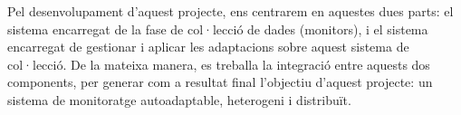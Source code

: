 Pel desenvolupament d'aquest projecte, ens centrarem en aquestes dues parts: el sistema encarregat de la fase de col·lecció de dades (monitors), i el sistema encarregat de gestionar i aplicar les adaptacions sobre aquest sistema de col·lecció. De la mateixa manera, es treballa la integració entre aquests dos components, per generar com a resultat final l'objectiu d'aquest projecte: un sistema de monitoratge autoadaptable, heterogeni i distribuït.